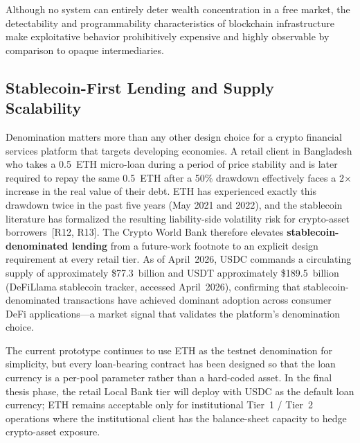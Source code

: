 \documentclass[12pt,a4paper]{report}
\begin{document}
Although no system can entirely deter wealth concentration in a free market, the detectability and programmability characteristics of blockchain infrastructure make exploitative behavior prohibitively expensive and highly observable by comparison to opaque intermediaries.

\subsection{Stablecoin-First Lending and Supply Scalability}
\label{sec:stablecoin-first}

Denomination matters more than any other design choice for a crypto financial services platform that targets developing economies. A retail client in Bangladesh who takes a 0.5~ETH micro-loan during a period of price stability and is later required to repay the same 0.5~ETH after a 50\% drawdown effectively faces a 2$\times$ increase in the real value of their debt. ETH has experienced exactly this drawdown twice in the past five years (May 2021 and 2022), and the stablecoin literature has formalized the resulting liability-side volatility risk for crypto-asset borrowers~[R12, R13]. The Crypto World Bank therefore elevates \textbf{stablecoin-denominated lending} from a future-work footnote to an explicit design requirement at every retail tier. As of April~2026, USDC commands a circulating supply of approximately \$77.3~billion and USDT approximately \$189.5~billion (DeFiLlama stablecoin tracker, accessed April~2026), confirming that stablecoin-denominated transactions have achieved dominant adoption across consumer DeFi applications---a market signal that validates the platform's denomination choice.

The current prototype continues to use ETH as the testnet denomination for simplicity, but every loan-bearing contract has been designed so that the loan currency is a per-pool parameter rather than a hard-coded asset. In the final thesis phase, the retail Local Bank tier will deploy with USDC as the default loan currency; ETH remains acceptable only for institutional Tier~1 / Tier~2 operations where the institutional client has the balance-sheet capacity to hedge crypto-asset exposure.
\end{document}
